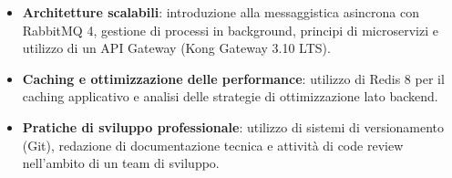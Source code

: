\begin{itemize}
    \item \textbf{Architetture scalabili}: introduzione alla messaggistica asincrona con RabbitMQ 4, gestione di processi in background, principi di microservizi e utilizzo di un API Gateway (Kong Gateway 3.10 LTS).

    \item \textbf{Caching e ottimizzazione delle performance}: utilizzo di Redis 8 per il caching applicativo e analisi delle strategie di ottimizzazione lato backend.

    \item \textbf{Pratiche di sviluppo professionale}: utilizzo di sistemi di versionamento (Git), redazione di documentazione tecnica e attività di code review nell'ambito di un team di sviluppo.
\end{itemize}
\newpage